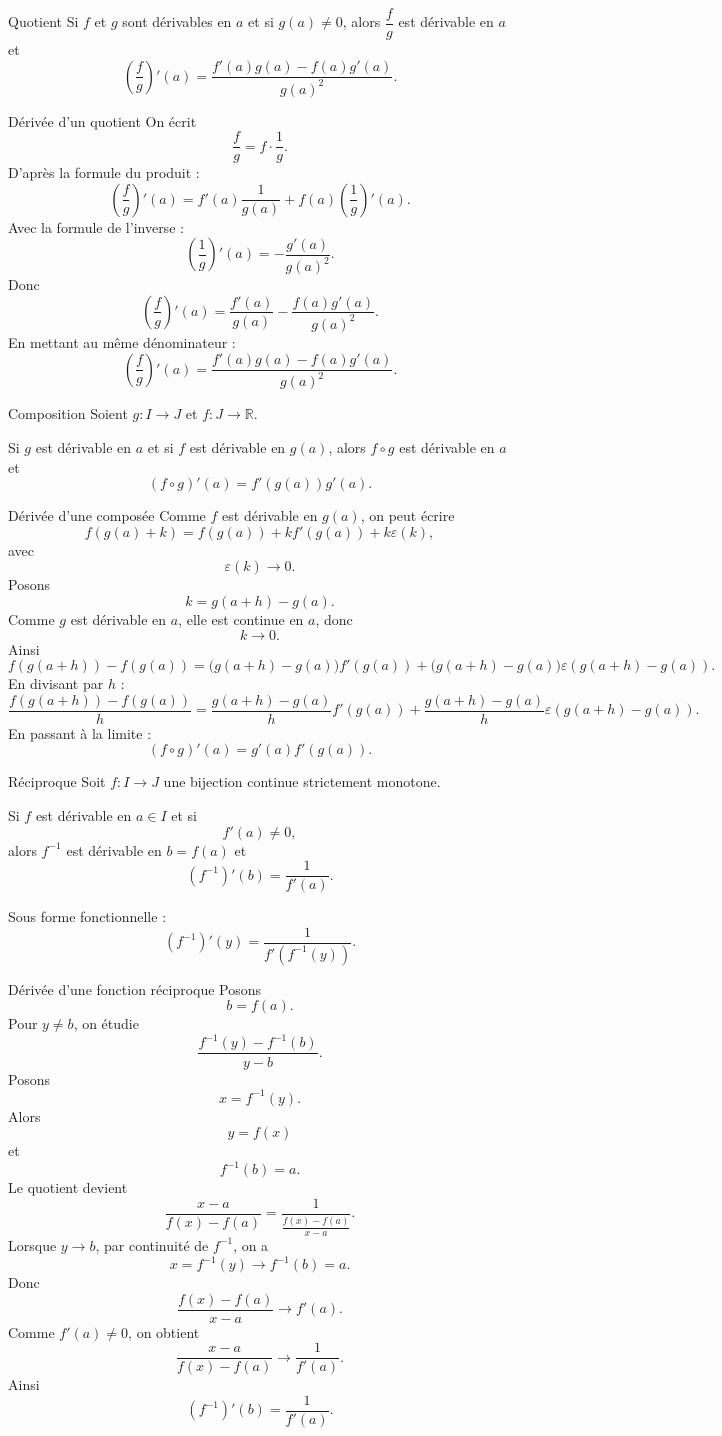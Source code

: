 \documentclass[11pt,a4paper]{article}
\newcommand{\R}{\mathbb{R}}
\begin{document}
\begin{theorembox}{Quotient}
Si $f$ et $g$ sont dérivables en $a$ et si $g(a)\neq0$, alors $\dfrac fg$ est dérivable en $a$ et
\[
\left(\frac fg\right)'(a)=\frac{f'(a)g(a)-f(a)g'(a)}{g(a)^2}.
\]
\end{theorembox}

\begin{proofbox}{Dérivée d'un quotient}
On écrit
\[
\frac fg=f\cdot \frac1g.
\]
D'après la formule du produit :
\[
\left(\frac fg\right)'(a)
=
f'(a)\frac1{g(a)}
+
f(a)\left(\frac1g\right)'(a).
\]
Avec la formule de l'inverse :
\[
\left(\frac1g\right)'(a)=-\frac{g'(a)}{g(a)^2}.
\]
Donc
\[
\left(\frac fg\right)'(a)
=
\frac{f'(a)}{g(a)}
-
\frac{f(a)g'(a)}{g(a)^2}.
\]
En mettant au même dénominateur :
\[
\left(\frac fg\right)'(a)
=
\frac{f'(a)g(a)-f(a)g'(a)}{g(a)^2}.
\]
\end{proofbox}

\begin{theorembox}{Composition}
Soient $g:I\to J$ et $f:J\to\R$.

Si $g$ est dérivable en $a$ et si $f$ est dérivable en $g(a)$, alors $f\circ g$ est dérivable en $a$ et
\[
(f\circ g)'(a)=f'(g(a))g'(a).
\]
\end{theorembox}

\begin{proofbox}{Dérivée d'une composée}
Comme $f$ est dérivable en $g(a)$, on peut écrire
\[
f(g(a)+k)=f(g(a))+kf'(g(a))+k\varepsilon(k),
\]
avec
\[
\varepsilon(k)\to0.
\]
Posons
\[
k=g(a+h)-g(a).
\]
Comme $g$ est dérivable en $a$, elle est continue en $a$, donc
\[
k\to0.
\]
Ainsi
\[
f(g(a+h))-f(g(a))
=
\bigl(g(a+h)-g(a)\bigr)f'(g(a))
+
\bigl(g(a+h)-g(a)\bigr)\varepsilon(g(a+h)-g(a)).
\]
En divisant par $h$ :
\[
\frac{f(g(a+h))-f(g(a))}{h}
=
\frac{g(a+h)-g(a)}{h}f'(g(a))
+
\frac{g(a+h)-g(a)}{h}\varepsilon(g(a+h)-g(a)).
\]
En passant à la limite :
\[
(f\circ g)'(a)=g'(a)f'(g(a)).
\]
\end{proofbox}

\begin{theorembox}{Réciproque}
Soit $f:I\to J$ une bijection continue strictement monotone.

Si $f$ est dérivable en $a\in I$ et si
\[
f'(a)\neq0,
\]
alors $f^{-1}$ est dérivable en $b=f(a)$ et
\[
(f^{-1})'(b)=\frac1{f'(a)}.
\]

Sous forme fonctionnelle :
\[
(f^{-1})'(y)=\frac1{f'(f^{-1}(y))}.
\]
\end{theorembox}

\begin{proofbox}{Dérivée d'une fonction réciproque}
Posons
\[
b=f(a).
\]
Pour $y\neq b$, on étudie
\[
\frac{f^{-1}(y)-f^{-1}(b)}{y-b}.
\]
Posons
\[
x=f^{-1}(y).
\]
Alors
\[
y=f(x)
\]
et
\[
f^{-1}(b)=a.
\]
Le quotient devient
\[
\frac{x-a}{f(x)-f(a)}
=
\frac1{\frac{f(x)-f(a)}{x-a}}.
\]
Lorsque $y\to b$, par continuité de $f^{-1}$, on a
\[
x=f^{-1}(y)\to f^{-1}(b)=a.
\]
Donc
\[
\frac{f(x)-f(a)}{x-a}\to f'(a).
\]
Comme $f'(a)\neq0$, on obtient
\[
\frac{x-a}{f(x)-f(a)}\to \frac1{f'(a)}.
\]
Ainsi
\[
(f^{-1})'(b)=\frac1{f'(a)}.
\]
\end{proofbox}
\end{document}
